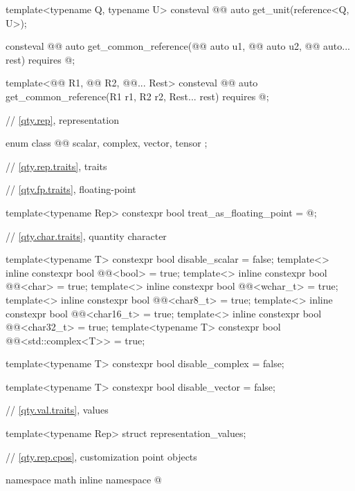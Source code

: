 \begin{codeblock}
{template<typename Q, typename U>
consteval @@ auto get_unit(reference<Q, U>);

consteval @@ auto get_common_reference(@@ auto u1, @@ auto u2,
                                         @@ auto... rest)
  requires @\seebelownc@;

template<@@ R1, @@ R2, @@... Rest>
consteval @@ auto get_common_reference(R1 r1, R2 r2, Rest... rest)
  requires @\seebelownc@;

// \ref{qty.rep}, representation

enum class @@ { scalar, complex, vector, tensor };

// \ref{qty.rep.traits}, traits

// \ref{qty.fp.traits}, floating-point

template<typename Rep>
constexpr bool treat_as_floating_point = @\seebelownc@;

// \ref{qty.char.traits}, quantity character

template<typename T>
constexpr bool disable_scalar = false;
template<>
inline constexpr bool @@<bool> = true;
template<>
inline constexpr bool @@<char> = true;
template<>
inline constexpr bool @@<wchar_t> = true;
template<>
inline constexpr bool @@<char8_t> = true;
template<>
inline constexpr bool @@<char16_t> = true;
template<>
inline constexpr bool @@<char32_t> = true;
template<typename T>
constexpr bool @@<std::complex<T>> = true;

template<typename T>
constexpr bool disable_complex = false;

template<typename T>
constexpr bool disable_vector = false;

// \ref{qty.val.traits}, values

template<typename Rep>
struct representation_values;

// \ref{qty.rep.cpos}, customization point objects

namespace math {
  inline namespace @}}
\end{codeblock}
